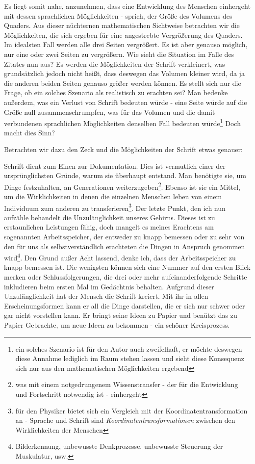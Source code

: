 \documentclass[12pt,a4paper,oneside]{article}
\begin{document}
  Es liegt somit nahe, anzunehmen, dass eine Entwicklung des Menschen einhergeht mit dessen sprachlichen Möglichkeiten - sprich, der Größe des Volumens des Quaders. Aus dieser nüchternen mathematischen Sichtweise betrachten wir die Möglichkeiten, die sich ergeben für eine angestrebte Vergrößerung des Quaders. Im idealsten Fall werden alle drei Seiten vergrößert. Es ist aber genauso möglich, nur eine oder zwei Seiten zu vergrößern. Wie sieht die Situation im Falle des Zitates nun aus? Es werden die Möglichkeiten der Schrift verkleinert, was grundsätzlich jedoch nicht heißt, dass deswegen das Volumen kleiner wird, da ja die anderen beiden Seiten genauso größer werden können. Es stellt sich nur die Frage, ob ein solches Szenario als realistisch zu erachten sei? Man bedenke außerdem, was ein Verlust von Schrift bedeuten würde - eine Seite würde auf die Größe null zusammenschrumpfen, was für das Volumen und die damit verbundenen sprachlichen Möglichkeiten denselben Fall bedeuten würde\footnote{ein solches Szenario ist für den Autor auch zweifelhaft, er möchte deswegen diese Annahme lediglich im Raum stehen lassen und sieht diese Konsequenz sich nur aus den mathematischen Möglichkeiten ergebend} Doch macht dies Sinn?
  
  Betrachten wir dazu den Zeck und die Möglichkeiten der Schrift etwas genauer:
  
  Schrift dient zum Einen zur Dokumentation. Dies ist vermutlich einer der ursprünglichsten Gründe, warum sie überhaupt entstand. Man benötigte sie, um Dinge festzuhalten, an Generationen weiterzugeben\footnote{was mit einem notgedrungenem Wissenstransfer - der für die Entwicklung und Fortschritt notwendig ist - einhergeht}. Ebenso ist sie ein Mittel, um die Wirklichkeiten in denen die einzelnen Menschen leben von einem Individuum zum anderen zu transferieren\footnote{für den Physiker bietet sich ein Vergleich mit der Koordinatentransformation an - Sprache und Schrift sind \textit{Koordinatentransformationen} zwischen den Wirklichkeiten der Menschen}. Der letzte Punkt, den ich nun aufzähle behandelt die Unzulänglichkeit unseres Gehirns. Dieses ist zu erstaunlichen Leistungen fähig, doch mangelt es meines Erachtens am sogenannten Arbeitsspeicher, der entweder zu knapp bemessen oder zu sehr von den für uns als selbstverständlich erachteten die Dingen in Anspruch genommen wird\footnote{Bilderkennung, unbewusste Denkprozesse, unbewusste Steuerung der Muskulatur, usw.}. Den Grund außer Acht lassend, denke ich, dass der Arbeitsspeicher zu knapp bemessen ist. Die wenigsten können sich eine Nummer auf den ersten Blick merken oder Schlussfolgerungen, die drei oder mehr aufeinanderfolgende Schritte inkludieren beim ersten Mal im Gedächtnis behalten. Aufgrund dieser Unzulänglichkeit hat der Mensch die Schrift kreiert. Mit ihr in allen Erscheinungsformen kann er all die Dinge darstellen, die er sich nur schwer oder gar nicht vorstellen kann. Er bringt seine Ideen zu Papier und benützt das zu Papier Gebrachte, um neue Ideen zu bekommen - ein schöner Kreisprozess.\\
  
\end{document}
